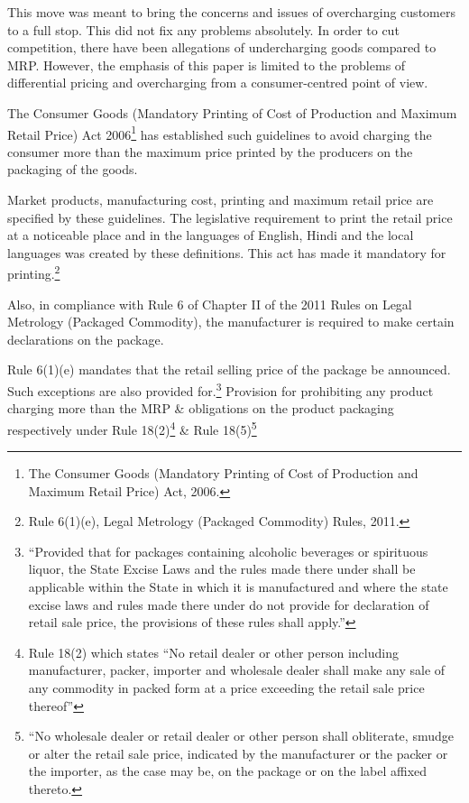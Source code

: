 \begin{multicols}{2}
\noi
This move was meant to bring the concerns and issues of overcharging customers to a full stop.
This did not fix any problems absolutely. In order to cut competition, there have been allegations of undercharging goods compared to MRP. However, the emphasis of this paper is
limited to the problems of differential pricing and overcharging from a consumer-centred point
of view.

\vspace{-.15cm}

\noi
The Consumer Goods (Mandatory Printing of Cost of Production and Maximum Retail Price)
Act 2006\footnote{The Consumer Goods (Mandatory Printing of Cost of Production and Maximum Retail Price) Act, 2006.} has established such guidelines to avoid charging the consumer more than the
maximum price printed by the producers on the packaging of the goods.

\vspace{-.15cm}

\noi
Market products, manufacturing cost, printing and maximum retail price are specified by these
guidelines. The legislative requirement to print the retail price at a noticeable place and in the
languages of English, Hindi and the local languages was created by these definitions. This act
has made it mandatory for printing.\footnote{Rule 6(1)(e), Legal Metrology (Packaged Commodity) Rules, 2011.}

\vspace{-.15cm}

\noi
Also, in compliance with Rule 6 of Chapter II of the 2011 Rules on Legal Metrology (Packaged
Commodity), the manufacturer is required to make certain declarations on the package.

\noi
Rule 6(1)(e) mandates that the retail selling price of the package be announced. Such
exceptions are also provided for.\footnote{“Provided that for packages containing alcoholic beverages or spirituous liquor, the State Excise Laws and the rules made there under shall be applicable within the State in which it is manufactured and where the state excise laws and rules made there under do not provide for declaration of retail sale price, the provisions of these rules shall apply.”} Provision for prohibiting any product charging more than the MRP \& obligations on the product packaging respectively under Rule 18(2)\footnote{Rule 18(2) which states “No retail dealer or other person including manufacturer, packer, importer and wholesale dealer shall make any sale of any commodity in packed form at a price exceeding the retail sale price thereof”} \& Rule 18(5)\footnote{“No wholesale dealer or retail dealer or other person shall obliterate, smudge or alter the retail sale price, indicated by the manufacturer or the packer or the importer, as the case may be, on the package or on the label affixed thereto.}


\end{multicols}
